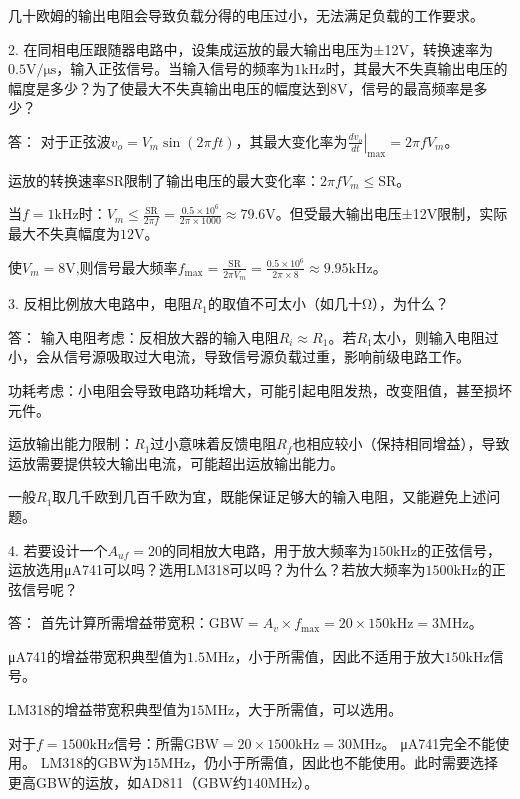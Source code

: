 \documentclass[12pt,a4paper]{article}
\begin{document}
几十欧姆的输出电阻会导致负载分得的电压过小，无法满足负载的工作要求。

2. 在同相电压跟随器电路中，设集成运放的最大输出电压为±12V，转换速率为$0.5\text{V/μs}$，输入正弦信号。当输入信号的频率为$1\text{kHz}$时，其最大不失真输出电压的幅度是多少？为了使最大不失真输出电压的幅度达到$8\text{V}$，信号的最高频率是多少？

答：
   对于正弦波$v_o = V_m \sin(2\pi ft)$，其最大变化率为$\left.\frac{dv_o}{dt}\right|_{\max} = 2\pi f V_m$。

   运放的转换速率SR限制了输出电压的最大变化率：$2\pi f V_m \leq \text{SR}$。

   当$f = 1\text{kHz}$时：$V_m \leq \frac{\text{SR}}{2\pi f} = \frac{0.5\times10^6}{2\pi\times1000} \approx 79.6\text{V}$。但受最大输出电压±12V限制，实际最大不失真幅度为$12\text{V}$。
   
   使$V_m = 8\text{V}$,则信号最大频率$f_{\max} = \frac{\text{SR}}{2\pi V_m} = \frac{0.5\times10^6}{2\pi\times8} \approx 9.95\text{kHz}$。

3. 反相比例放大电路中，电阻$R_1$的取值不可太小（如几十Ω），为什么？

答：
   输入电阻考虑：反相放大器的输入电阻$R_i \approx R_1$。若$R_1$太小，则输入电阻过小，会从信号源吸取过大电流，导致信号源负载过重，影响前级电路工作。

   功耗考虑：小电阻会导致电路功耗增大，可能引起电阻发热，改变阻值，甚至损坏元件。

   运放输出能力限制：$R_1$过小意味着反馈电阻$R_f$也相应较小（保持相同增益），导致运放需要提供较大输出电流，可能超出运放输出能力。

   一般$R_1$取几千欧到几百千欧为宜，既能保证足够大的输入电阻，又能避免上述问题。

4. 若要设计一个$A_{uf}=20$的同相放大电路，用于放大频率为$150\text{kHz}$的正弦信号，运放选用μA741可以吗？选用LM318可以吗？为什么？若放大频率为$1500\text{kHz}$的正弦信号呢？

答：
   首先计算所需增益带宽积：$\text{GBW} = A_v \times f_{\max} = 20 \times 150\text{kHz} = 3\text{MHz}$。

   μA741的增益带宽积典型值为$1.5\text{MHz}$，小于所需值，因此不适用于放大$150\text{kHz}$信号。

   LM318的增益带宽积典型值为$15\text{MHz}$，大于所需值，可以选用。

   对于$f=1500\text{kHz}$信号：所需$\text{GBW} = 20 \times 1500\text{kHz} = 30\text{MHz}$。
    μA741完全不能使用。
    LM318的GBW为$15\text{MHz}$，仍小于所需值，因此也不能使用。此时需要选择更高GBW的运放，如AD811（GBW约$140\text{MHz}$）。
\end{document}
